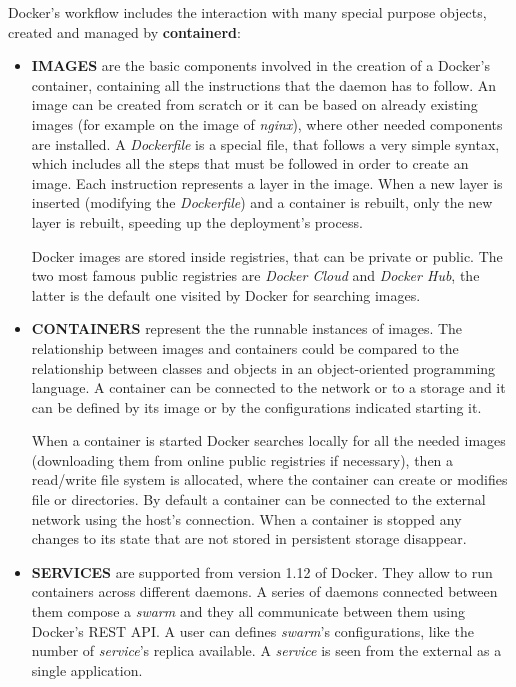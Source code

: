 \documentclass[a4paper,12pt]{article}
\begin{document}
Docker's workflow includes the interaction with many special purpose objects,
created and managed by \textbf{containerd}:
\begin{itemize}
  \item \textbf{IMAGES} are the basic components involved in the creation of a
  Docker's container, containing all the instructions that the daemon has to
  follow. An image can be created from scratch or it can be based on already
  existing images (for example on the image of \textit{nginx}), where other
  needed components are installed. A \textit{Dockerfile} is a special file, that
  follows a very simple syntax, which includes all the steps that must be
  followed in order to create an image. Each instruction represents a layer in
  the image. When a new layer is inserted (modifying the \textit{Dockerfile})
  and a container is rebuilt, only the new layer is rebuilt, speeding up the
  deployment's process.\par Docker images are stored inside registries, that can
  be private or public. The two most famous public registries are \textit{Docker
  Cloud} and \textit{Docker Hub}, the latter is the default one visited by
  Docker for searching images.   
  \item \textbf{CONTAINERS} represent the the runnable instances of images.
  The relationship between images and containers could be compared to the
  relationship between classes and objects in an object-oriented programming
  language. A container can be connected to the network or to a storage and it
  can be defined by its image or by the configurations indicated starting
  it.\par When a container is started Docker searches locally for all the needed
  images (downloading them from online public registries if necessary), then a
  read/write file system is allocated, where the container can create or modifies
  file or directories. By default a container can be connected to the external
  network using the host's connection. When a container is stopped  any changes
  to its state that are not stored in persistent storage disappear.
  \item \textbf{SERVICES} are supported from version 1.12 of Docker. They allow
  to run containers across different daemons. A series of daemons connected
  between them compose a \textit{swarm} and they all communicate between them
  using Docker's REST API. A user can defines \textit{swarm}'s configurations,
  like the number of \textit{service}'s replica available. A \textit{service} is
  seen from the external as a single application.
\end{itemize}   
\end{document}
